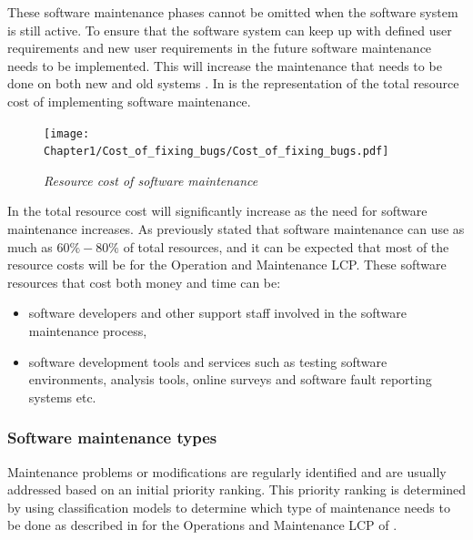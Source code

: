 These software maintenance phases cannot be omitted when the software system is still active. To ensure that the software system can keep up with defined user requirements and new user requirements in the future software maintenance needs to be implemented.  This will increase the maintenance that needs to be done on both new and old systems \cite{Niu2018, Galster2019, Hasan2012}. In  is the representation of the total resource cost of implementing software maintenance.

\begin{figure}[!htb]
	\centering %
	\texttt{[image: Chapter1/Cost\_of\_fixing\_bugs/Cost\_of\_fixing\_bugs.pdf]}
	\caption[Resource cost of software maintenance]
	{\textit{Resource cost of software maintenance \cite{Ogheneovo2014}}}\label{fig:ch1_costsOfFixingBugs}
\end{figure}

In  the total resource cost will significantly increase as the need for software maintenance increases. As previously stated that software maintenance can use as much as $60\%-80\%$ of total resources, and it can be expected that most of the resource costs will be for the Operation and Maintenance LCP. These software resources that cost both money and time can be:

\begin{itemize}
	\item software developers and other support staff involved in the software maintenance process,
	\item software development tools and services such as testing software environments, analysis tools, online surveys and software fault reporting systems etc.
\end{itemize}

\subsubsection{Software maintenance types}
Maintenance problems or modifications are regularly identified and are usually addressed based on an initial priority ranking. This priority ranking is determined by using classification models to determine which type of maintenance needs to be done as described in  for the Operations and Maintenance LCP of  \cite{Tang2010, Ping2010}.

